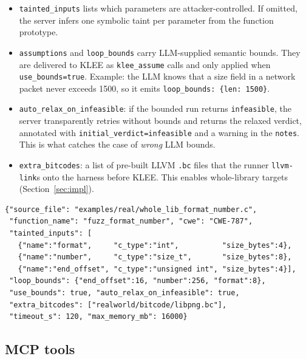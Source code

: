 \documentclass[3p,times,procedia]{elsarticle}
\begin{document}
\begin{itemize}
    \item \texttt{tainted\_inputs} lists which parameters are attacker-controlled. If omitted, the server infers one symbolic taint per parameter from the function prototype.
    \item \texttt{assumptions} and \texttt{loop\_bounds} carry LLM-supplied semantic bounds. They are delivered to KLEE as \texttt{klee\_assume} calls and only applied when \texttt{use\_bounds=true}. Example: the LLM knows that a size field in a network packet never exceeds 1500, so it emits \texttt{loop\_bounds: \{len: 1500\}}.
    \item \texttt{auto\_relax\_on\_infeasible}: if the bounded run returns \texttt{infeasible}, the server transparently retries without bounds and returns the relaxed verdict, annotated with \texttt{initial\_verdict=infeasible} and a warning in the \texttt{notes}. This is what catches the case of \emph{wrong} LLM bounds.
    \item \texttt{extra\_bitcodes}: a list of pre-built LLVM \texttt{.bc} files that the runner \texttt{llvm-link}s onto the harness before KLEE. This enables whole-library targets (Section~\ref{sec:impl}).
\end{itemize}

\begin{lstlisting}[style=jsoncode, caption={Candidate JSON for the libpng \texttt{png\_format\_number} OOB write.}, label={lst:candidate}]
{"source_file": "examples/real/whole_lib_format_number.c",
 "function_name": "fuzz_format_number", "cwe": "CWE-787",
 "tainted_inputs": [
   {"name":"format",     "c_type":"int",          "size_bytes":4},
   {"name":"number",     "c_type":"size_t",       "size_bytes":8},
   {"name":"end_offset", "c_type":"unsigned int", "size_bytes":4}],
 "loop_bounds": {"end_offset":16, "number":256, "format":8},
 "use_bounds": true, "auto_relax_on_infeasible": true,
 "extra_bitcodes": ["realworld/bitcode/libpng.bc"],
 "timeout_s": 120, "max_memory_mb": 16000}
\end{lstlisting}

\subsection{MCP tools}
\label{sec:tools}
\end{document}
